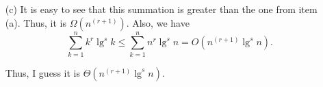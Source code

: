 \documentclass{report}
\makeatletter
\renewenvironment{framed}{%
 \def\FrameCommand##1{\hskip\@totalleftmargin
 \fboxsep=\FrameSep\fbox{##1}}%
 \MakeFramed {\advance\hsize-\width
   \@totalleftmargin\z@ \linewidth\hsize
   \@setminipage}}%
 {\par\unskip\endMakeFramed}
\makeatother
\begin{document}
\begin{enumerate}
\begin{framed}
\begin{enumerate}
\item[(c)] It is easy to see that this summation is greater than the one from
item (a). Thus, it is $\Omega(n^{(r + 1)})$. Also, we have
\[
  \sum_{k = 1}^{n} k^r \lg^{s} k \le \sum_{k = 1}^{n} n^r \lg^{s} n = O(n^{(r + 1)} \lg^s n).
\]

Thus, I guess it is $\Theta(n^{(r + 1)} \lg^s n)$.

\end{enumerate}
\end{framed}

\end{enumerate}
\end{document}
